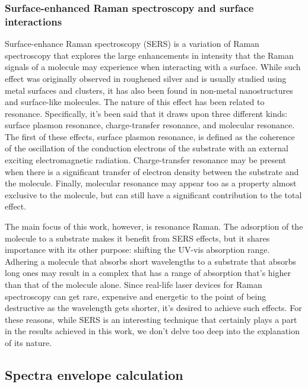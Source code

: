 \subsubsection{Surface-enhanced Raman spectroscopy and surface interactions}
Surface-enhance Raman spectroscopy (SERS) is a variation of Raman spectroscopy that explores the large enhancements in intensity that the Raman signals of a molecule may experience when interacting with a surface.
While such effect was originally observed in roughened silver and is usually studied using metal surfaces and clusters, it has also been found in non-metal nanostructures and surface-like molecules.
The nature of this effect has been related to resonance.
Specifically, it's been said that it draws upon three different kinds: surface plasmon resonance, charge-transfer resonance, and molecular resonance.
The first of these effects, surface plasmon resonance, is defined as the coherence of the oscillation of the conduction electrons of the substrate with an external exciting electromagnetic radiation.
Charge-transfer resonance may be present when there is a significant transfer of electron density between the substrate and the molecule.
Finally, molecular resonance may appear too as a property almost exclusive to the molecule, but can still have a significant contribution to the total effect.

The main focus of this work, however, is resonance Raman.
The adsorption of the molecule to a substrate makes it benefit from SERS effects, but it shares importance with its other purpose: shifting the UV-vis absorption range.
Adhering a molecule that absorbs short wavelengths to a substrate that absorbs long ones may result in a complex that has a range of absorption that's higher than that of the molecule alone.
Since real-life laser devices for Raman spectroscopy can get rare, expensive and energetic to the point of being destructive as the wavelength gets shorter, it's desired to achieve such effects.
For these reasons, while SERS is an interesting technique that certainly plays a part in the results achieved in this work, we don't delve too deep into the explanation of its nature.

\subsection{Spectra envelope calculation}

